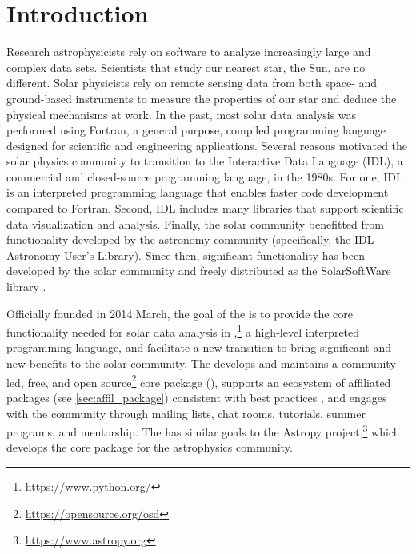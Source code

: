 \section{Introduction}
\label{sec:intro}

Research astrophysicists rely on software to analyze increasingly large and complex data sets.
Scientists that study our nearest star, the Sun, are no different.
Solar physicists rely on remote sensing data from both space- and ground-based instruments to measure the properties of our star and deduce the physical mechanisms at work.
In the past, most solar data analysis was performed using Fortran, a general purpose, compiled programming language designed for scientific and engineering applications.
Several reasons motivated the solar physics community to transition to the Interactive Data Language (IDL), a commercial and closed-source programming language, in the 1980s.
For one, IDL is an interpreted programming language that enables faster code development compared to Fortran.
Second, IDL includes many libraries that support scientific data visualization and analysis.
Finally, the solar community benefitted from functionality developed by the astronomy community (specifically, the IDL Astronomy User's Library).
Since then, significant functionality has been developed by the solar community and freely distributed as the SolarSoftWare library \citep{Freeland:1998we}.

Officially founded in 2014 March, the goal of the \sunpyproj is to provide the core functionality needed for solar data analysis in \python,\footnote{\url{https://www.python.org/}} a high-level interpreted programming language, and facilitate a new transition to bring significant and new benefits to the solar community.
The \sunpyproj develops and maintains a community-led, free, and open source\footnote{\url{https://opensource.org/osd}} core \python package (\sunpypkg), supports an ecosystem of affiliated packages (see \autoref{sec:affil_package}) consistent with best practices \citep{Wilson:2014cka}, and engages with the community through mailing lists, chat rooms, tutorials, summer programs, and mentorship.
The \sunpyproj has similar goals to the Astropy project,\footnote{\url{https://www.astropy.org}} which develops the \astropypkg core package \citep{astropy2018} for the astrophysics community.

